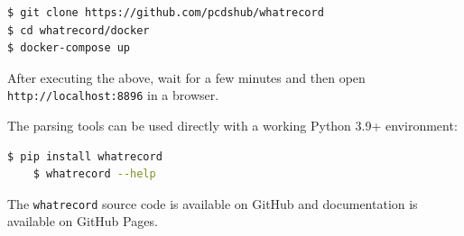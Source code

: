 \documentclass[letter,
               keeplastbox,   %
               ]{jacow}
\begin{document}
\begin{lstlisting}[language=bash]
$ git clone https://github.com/pcdshub/whatrecord
$ cd whatrecord/docker
$ docker-compose up
\end{lstlisting}
After executing the above, wait for a few minutes and then open
\verb_http://localhost:8896_ in a browser.

The parsing tools can be used directly with a working Python 3.9+ environment:

\begin{lstlisting}[language=bash]
	$ pip install whatrecord
	$ whatrecord --help
\end{lstlisting}

The \verb_whatrecord_ source code is available on
GitHub\cite{whatrecord-github} and documentation is available on GitHub
Pages\cite{whatrecord-docs}.
\end{document}
